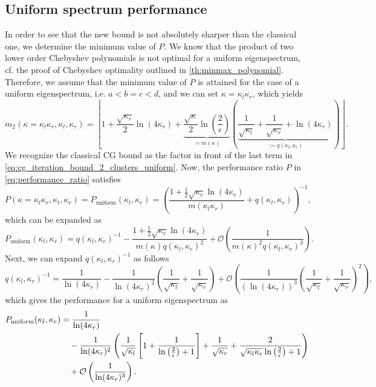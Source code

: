 \subsection{Uniform spectrum performance}\label{sec:cg_sharpened_convrate_uniform_performance}
In order to see that the new bound is not absolutely sharper than the classical one, we determine the minimum value of $P$. We know that the product of two lower order Chebyshev polynomials is not optimal for a uniform eigenspectrum, cf. the proof of Chebyshev optimality outlined in \cref{th:minmax_polynomial}. Therefore, we assume that the minimum value of $P$ is attained for the case of a uniform eigenspectrum, i.e. $a<b=c<d$, and we can set $\kappa=\kappa_l\kappa_r$, which yields
\begin{equation}
    m_2(\kappa=\kappa_l\kappa_r, \kappa_l, \kappa_r)=\left\lfloor
        1 
        + \frac{\sqrt{\kappa_r}}{2}\ln\left(4\kappa_r\right)
        + \underbrace{\frac{\sqrt{\kappa}}{2}\ln\left(\frac{2}{\epsilon}\right)}_{=m(\kappa)}\left(
            \underbrace{
                \frac{1}{\sqrt{\kappa_l}}
                + \frac{1}{\sqrt{\kappa_r}}
                + \ln\left(4\kappa_r\right)
            }_{:= q(\kappa_l, \kappa_r)}
        \right)
    \right\rfloor.
    \label{eq:cg_iteration_bound_2_clusters_uniform}
\end{equation}
We recognize the classical CG bound as the factor in front of the last term in \cref{eq:cg_iteration_bound_2_clusters_uniform}. Now, the performance ratio $P$ in \cref{eq:performance_ratio} satisfies
\begin{equation}
    P(\kappa=\kappa_l\kappa_r, \kappa_l, \kappa_r) = P_{\text{uniform}}(\kappa_l, \kappa_r) = \left(\frac{1 + \frac{1}{2}\sqrt{\kappa_r}\ln(4\kappa_r)}{m(\kappa_l\kappa_r)} + q(\kappa_l, \kappa_r)\right)^{-1},
    \label{eq:performance_ratio_uniform}
\end{equation}
which can be expanded as
\[
    P_{\text{uniform}}(\kappa_l, \kappa_r) = q(\kappa_l, \kappa_r)^{-1} - \frac{1 + \frac{1}{2}\sqrt{\kappa_r}\ln(4\kappa_r)}{m(\kappa)q(\kappa_l, \kappa_r)^2} + \mathcal{O}\left(\frac{1}{m(\kappa)^2q(\kappa_l, \kappa_r)^3}\right).
\]
Next, we can expand $q(\kappa_l, \kappa_r)^{-1}$ as follows
\[
    q(\kappa_l, \kappa_r)^{-1} = \frac{1}{\ln(4\kappa_r)} - \frac{1}{\ln(4\kappa_r)^2}\left(\frac{1}{\sqrt{\kappa_l}} + \frac{1}{\sqrt{\kappa_r}}\right) + \mathcal{O}\left(\frac{1}{(\ln(4\kappa_r))^3}\left(\frac{1}{\sqrt{\kappa_l}} + \frac{1}{\sqrt{\kappa_r}}\right)^2\right),
\]
which gives the performance for a uniform eigenspectrum as
\begin{align}
    P_{\text{uniform}}(\kappa_l, \kappa_r) &= \frac{1}{\ln(4\kappa_r)} \notag \\
    &\quad - \frac{1}{\ln(4\kappa_r)^2}\left(\frac{1}{\sqrt{\kappa_l}}\left[1 + \frac{1}{\ln\left(\frac{2}{\epsilon}\right) + 1}\right] + \frac{1}{\sqrt{\kappa_r}} + \frac{2}{\sqrt{\kappa_l\kappa_r}\ln\left(\frac{2}{\epsilon}\right) + 1}\right) \notag \\
    &\quad + \mathcal{O}\left(\frac{1}{\ln(4\kappa_r)^3}\right).
    \label{eq:performance_ratio_uniform_expansion}
\end{align}

